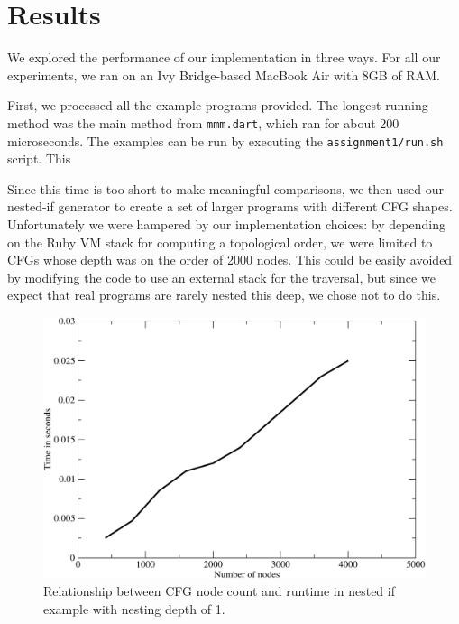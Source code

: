 \documentclass[10pt,twocolumn]{article}
\begin{document}
\section{Results}
\label{eval}


We explored the performance of our implementation in three ways. For
all our experiments, we ran on an Ivy Bridge-based MacBook Air with
8GB of RAM.

First, we processed all the example programs provided. The
longest-running method was the main method from \texttt{mmm.dart},
which ran for about 200 microseconds. The examples can be run by
executing the \texttt{assignment1/run.sh} script. This 

Since this time is too short to make meaningful comparisons, we then
used our nested-if generator to create a set of larger programs with
different CFG shapes. Unfortunately we were hampered by our
implementation choices: by depending on the Ruby VM stack for
computing a topological order, we were limited to CFGs whose depth was
on the order of 2000 nodes. This could be easily avoided by modifying
the code to use an external stack for the traversal, but since we
expect that real programs are rarely nested this deep, we chose not to
do this.


\begin{figure}
\begin{center}
  \includegraphics[width=0.95\columnwidth]{figs/g1.pdf}
\begin{minipage}{0.95\columnwidth}
  \caption{\label{fig:nodes} Relationship between CFG node count and runtime in nested if example with nesting depth of 1.}
\end{minipage}
\end{center}
\end{figure}
\end{document}
